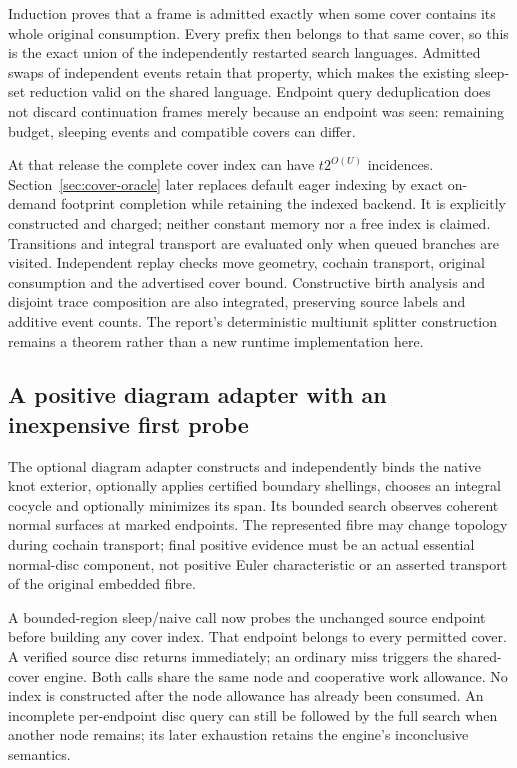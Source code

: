 Induction proves that a frame is admitted exactly when some cover contains
its whole original consumption. Every prefix then belongs to that same
cover, so this is the exact union of the independently restarted search
languages. Admitted swaps of independent events retain that property,
which makes the existing sleep-set reduction valid on the shared language.
Endpoint query deduplication does not discard continuation frames merely
because an endpoint was seen: remaining budget, sleeping events and
compatible covers can differ.

At that release the complete cover index can have $t2^{O(U)}$ incidences.
Section~\ref{sec:cover-oracle} later replaces default eager indexing by exact
on-demand footprint completion while retaining the indexed backend. It is explicitly
constructed and charged; neither constant memory nor a free index is claimed.
Transitions and integral transport are evaluated only when queued branches
are visited. Independent replay checks move geometry, cochain transport,
original consumption and the advertised cover bound. Constructive birth
analysis and disjoint trace composition are also integrated, preserving
source labels and additive event counts. The report's deterministic
multiunit splitter construction remains a theorem rather than a new runtime
implementation here.

\subsection{A positive diagram adapter with an inexpensive first probe}

The optional diagram adapter constructs and independently binds the native
knot exterior, optionally applies certified boundary shellings, chooses an
integral cocycle and optionally minimizes its span. Its bounded search
observes coherent normal surfaces at marked endpoints. The represented
fibre may change topology during cochain transport; final positive evidence
must be an actual essential normal-disc component, not positive Euler
characteristic or an asserted transport of the original embedded fibre.

A bounded-region sleep/naive call now probes the unchanged source endpoint
before building any cover index. That endpoint belongs to every permitted
cover. A verified source disc returns immediately; an ordinary miss triggers
the shared-cover engine. Both calls share the same node and cooperative
work allowance. No index is constructed after the node allowance has
already been consumed. An incomplete per-endpoint disc query can still be
followed by the full search when another node remains; its later exhaustion
retains the engine's inconclusive semantics.

